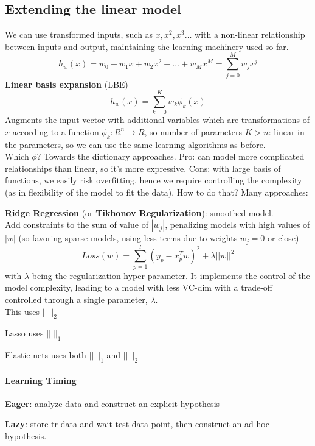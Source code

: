 \documentclass[10pt]{report}
\begin{document}
\subsection{Extending the linear model} We can use transformed inputs, such as $x, x^2, x^3\ldots$ with a non-linear relationship between inputs and output, maintaining the learning machinery used so far. $$h_w(x) = w_0 + w_1 x + w_2 x^2 + \ldots + w_M x^M = \sum_{j=0}^M w_j x^j$$ \textbf{Linear basis expansion} (LBE) $$h_w(x) = \sum_{k=0}^K w_k\phi_k(x)$$ Augments the input vector with additional variables which are transformations of $x$ according to a function $\phi_k : R^n \rightarrow R$, so number of parameters $K > n$: linear in the parameters, so we can use the same learning algorithms as before.\\
Which $\phi$? Towards the dictionary approaches. Pro: can model more complicated relationships than linear, so it's more expressive. Cons: with large basis of functions, we easily risk overfitting, hence we require controlling the complexity (as in flexibility of the model to fit the data). How to do that? Many approaches:
\begin{list}{}{}
	\item \textbf{Ridge Regression} (or \textbf{Tikhonov Regularization}): smoothed model.\\
	Add constraints to the sum of value of $|w_j|$, penalizing models with high values of $|w|$ (so favoring sparse models, using less terms due to weights $w_j = 0$ or close)
	$$Loss(w) = \sum_{p=1}^l (y_p - x_p^T w)^2 + \lambda||w||^2$$ with $\lambda$ being the regularization hyper-parameter. It implements the control of the model complexity, leading to a model with less VC-dim with a trade-off controlled through a single parameter, $\lambda$.\\
	This uses $||\:||_2$
	\item Lasso uses $||\:||_1$
	\item Elastic nets uses both $||\:||_1$ and $||\:||_2$
\end{list}
\paragraph{Learning Timing} \begin{list}{}{}
	\item \textbf{Eager}: analyze data and construct an explicit hypothesis
	\item \textbf{Lazy}: store tr data and wait test data point, then construct an ad hoc hypothesis.
\end{list}
\end{document}
